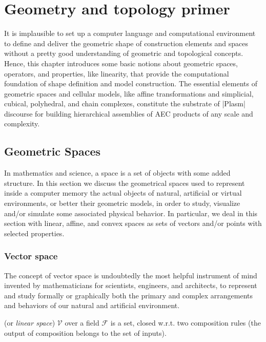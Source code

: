 
\chapter{Geometry and topology primer}
\label{chapt:3}

It is implausible to set up a computer language and computational environment to define and deliver the geometric shape of construction elements and spaces without a pretty good understanding of geometric and topological concepts. Hence, this chapter introduces some basic notions about geometric spaces, operators, and properties, like linearity, that provide the computational foundation of shape definition and model construction.
The essential elements of geometric spaces and cellular models, like affine transformations and simplicial, cubical, polyhedral, and chain complexes, constitute the substrate of |Plasm| discourse for building hierarchical assemblies of AEC products of any scale and complexity.

\section{Geometric Spaces}\label{}


In mathematics and science, a space is a set of objects with some added structure.
In this section we discuss the geometrical spaces used to represent inside a computer memory the actual objects of natural, artificial or virtual environments, or better their geometric models, in order to study, visualize and/or simulate some associated physical behavior. 
In particular, we deal in this section with linear, affine, and convex spaces as sets of vectors and/or points with selected properties.

\subsection{Vector space}
\label{subsec:2:style}

The concept of vector space is undoubtedly the most helpful instrument of mind invented by mathematicians for scientists, engineers, and architects, to represent and study formally or graphically both the primary and complex arrangements and behaviors of our natural and artificial environment.

\begin{definition} (or \emph{linear space}) $\mathcal{V}$ over a field $\mathcal{F}$ is a set, closed w.r.t. two composition rules (the output of composition belongs to the set of inputs).
\end{definition}


